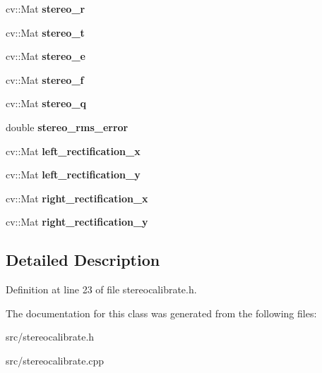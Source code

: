 \begin{DoxyCompactItemize}
\item 
\hypertarget{class_stereo_calibrate_aeb574c601840e023ac3bcada4c43d71b}{}cv\+::\+Mat {\bfseries stereo\+\_\+r}\label{class_stereo_calibrate_aeb574c601840e023ac3bcada4c43d71b}

\item 
\hypertarget{class_stereo_calibrate_aa4d8872e0c9d353d3d85dbd679e1153b}{}cv\+::\+Mat {\bfseries stereo\+\_\+t}\label{class_stereo_calibrate_aa4d8872e0c9d353d3d85dbd679e1153b}

\item 
\hypertarget{class_stereo_calibrate_ae47284ab43d5edb77bb09ec0d415daf5}{}cv\+::\+Mat {\bfseries stereo\+\_\+e}\label{class_stereo_calibrate_ae47284ab43d5edb77bb09ec0d415daf5}

\item 
\hypertarget{class_stereo_calibrate_a9683503b4ff3d2db1a9266a6a7837497}{}cv\+::\+Mat {\bfseries stereo\+\_\+f}\label{class_stereo_calibrate_a9683503b4ff3d2db1a9266a6a7837497}

\item 
\hypertarget{class_stereo_calibrate_ae684e6f92a70b3f4684d205cfca11463}{}cv\+::\+Mat {\bfseries stereo\+\_\+q}\label{class_stereo_calibrate_ae684e6f92a70b3f4684d205cfca11463}

\item 
\hypertarget{class_stereo_calibrate_a9904403fff5a29e885b8cb7df65e8df4}{}double {\bfseries stereo\+\_\+rms\+\_\+error}\label{class_stereo_calibrate_a9904403fff5a29e885b8cb7df65e8df4}

\item 
\hypertarget{class_stereo_calibrate_a38717dfe41458f60fc249e3a26fc21c4}{}cv\+::\+Mat {\bfseries left\+\_\+rectification\+\_\+x}\label{class_stereo_calibrate_a38717dfe41458f60fc249e3a26fc21c4}

\item 
\hypertarget{class_stereo_calibrate_a346a6e37301f5b4b45cacd7977c21b7d}{}cv\+::\+Mat {\bfseries left\+\_\+rectification\+\_\+y}\label{class_stereo_calibrate_a346a6e37301f5b4b45cacd7977c21b7d}

\item 
\hypertarget{class_stereo_calibrate_acb56d8421682bba175433ef4538dc7a5}{}cv\+::\+Mat {\bfseries right\+\_\+rectification\+\_\+x}\label{class_stereo_calibrate_acb56d8421682bba175433ef4538dc7a5}

\item 
\hypertarget{class_stereo_calibrate_ade96b91d120281da9e789d95f7f33902}{}cv\+::\+Mat {\bfseries right\+\_\+rectification\+\_\+y}\label{class_stereo_calibrate_ade96b91d120281da9e789d95f7f33902}

\end{DoxyCompactItemize}


\subsection{Detailed Description}


Definition at line 23 of file stereocalibrate.\+h.



The documentation for this class was generated from the following files\+:\begin{DoxyCompactItemize}
\item 
src/stereocalibrate.\+h\item 
src/stereocalibrate.\+cpp\end{DoxyCompactItemize}
